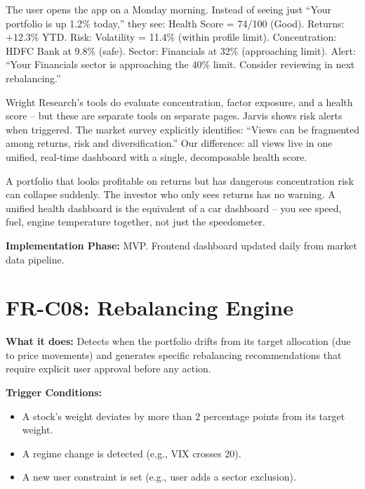 \documentclass[12pt, a4paper, openany, oneside]{report}
\begin{document}
\begin{examplebox}
The user opens the app on a Monday morning. Instead of seeing just ``Your portfolio is up 1.2\% today,'' they see: Health Score = 74/100 (Good). Returns: +12.3\% YTD. Risk: Volatility = 11.4\% (within profile limit). Concentration: HDFC Bank at 9.8\% (safe). Sector: Financials at 32\% (approaching limit). Alert: ``Your Financials sector is approaching the 40\% limit. Consider reviewing in next rebalancing.''
\end{examplebox}

\begin{gapbox}
Wright Research's tools do evaluate concentration, factor exposure, and a health score -- but these are separate tools on separate pages. Jarvis shows risk alerts when triggered. The market survey explicitly identifies: ``Views can be fragmented among returns, risk and diversification.'' Our difference: all views live in one unified, real-time dashboard with a single, decomposable health score.
\end{gapbox}

\begin{valuebox}
A portfolio that looks profitable on returns but has dangerous concentration risk can collapse suddenly. The investor who only sees returns has no warning. A unified health dashboard is the equivalent of a car dashboard -- you see speed, fuel, engine temperature together, not just the speedometer.
\end{valuebox}

\textbf{Implementation Phase:} MVP. Frontend dashboard updated daily from market data pipeline.

\section{FR-C08: Rebalancing Engine}

\textbf{What it does:} Detects when the portfolio drifts from its target allocation (due to price movements) and generates specific rebalancing recommendations that require explicit user approval before any action.

\textbf{Trigger Conditions:}
\begin{itemize}
  \item A stock's weight deviates by more than 2 percentage points from its target weight.
  \item A regime change is detected (e.g., VIX crosses 20).
  \item A new user constraint is set (e.g., user adds a sector exclusion).
\end{itemize}
\end{document}
